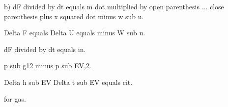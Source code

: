 b) dF divided by dt equals m dot multiplied by open parenthesis ... close parenthesis plus x squared dot minus w sub u.

Delta F equals Delta U equals minus W sub u.

dF divided by dt equals in.

p sub g12 minus p sub EV,2.

Delta h sub EV Delta t sub EV equals cit.

for gas.